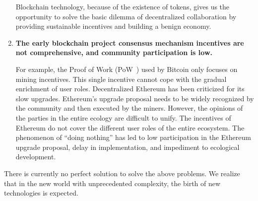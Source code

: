 \begin{enumerate}
	Blockchain technology, because of the existence of tokens, gives us the opportunity to solve the basic dilemma of decentralized collaboration by providing sustainable incentives and building a benign economy.

	\item

	\textbf{The early blockchain project consensus mechanism incentives are not comprehensive, and community participation is low. }

	For example, the Proof of Work (PoW~\cite{pow}) used by Bitcoin only focuses on mining incentives. This single incentive cannot cope with the gradual enrichment of user roles. Decentralized Ethereum has been criticized for its slow upgrades. Ethereum's upgrade proposal needs to be widely recognized by the community and then executed by the miners. However, the opinions of the parties in the entire ecology are difficult to unify. The incentives of Ethereum do not cover the different user roles of the entire ecosystem. The phenomenon of “doing nothing” has led to low participation in the Ethereum upgrade proposal, delay in implementation, and impediment to ecological development.

\end{enumerate}

There is currently no perfect solution to solve the above problems. We realize that in the new world with unprecedented complexity, the birth of new technologies is expected.

